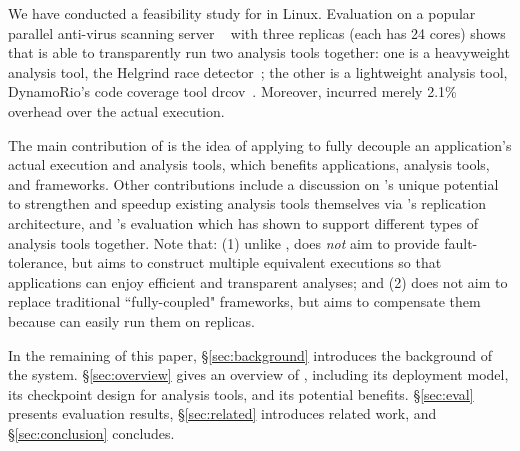 We have conducted a feasibility study for \xxx in Linux. Evaluation on a 
popular parallel anti-virus scanning server \clamav~\cite{clamav} with three 
replicas (each has 24 cores) shows that \xxx is able to transparently run two 
analysis tools together: one is a heavyweight analysis tool, the Helgrind race 
detector~\cite{valgrind:pldi}; the other is a lightweight analysis tool, 
DynamoRio's code coverage tool drcov~\cite{dynamorio}. Moreover, \xxx incurred 
merely 2.1\% overhead over the actual execution.


The main contribution of \xxx is the idea of applying \tsmr to fully decouple 
an application's actual execution and analysis tools, which benefits 
applications, analysis tools, and frameworks. Other contributions include a 
discussion on \xxx's unique potential to strengthen and speedup existing 
analysis tools themselves via \xxx's replication architecture, and \xxx's 
evaluation which has shown to support different types of analysis tools together. Note that: (1) unlike 
\repbox, \xxx does \emph{not} aim to provide fault-tolerance, but aims to 
construct multiple equivalent executions so that applications can enjoy 
efficient and transparent analyses; and (2) \xxx does not aim to replace 
traditional ``fully-coupled" frameworks, but aims to compensate them because \xxx 
can easily run them on replicas.


In the remaining of this paper, \S\ref{sec:background} introduces the 
background of the \repbox system. \S\ref{sec:overview} gives an overview of 
\xxx, including its deployment model, its checkpoint design for analysis 
tools, and its potential benefits. \S\ref{sec:eval} presents evaluation 
results, \S\ref{sec:related} introduces related work, and 
\S\ref{sec:conclusion} concludes.